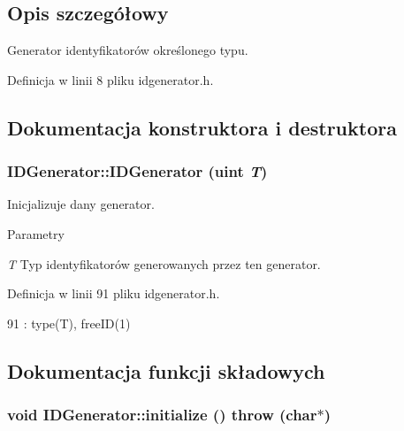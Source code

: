 \subsection{Opis szczegółowy}
Generator identyfikatorów określonego typu. 

Definicja w linii 8 pliku idgenerator.h.



\subsection{Dokumentacja konstruktora i destruktora}
\hypertarget{classIDGenerator_a9211b96bb2de7ec0479483c04b0263a5}{
\subsubsection[{IDGenerator}]{\setlength{\rightskip}{0pt plus 5cm}IDGenerator::IDGenerator (uint {\em T})}}
\label{classIDGenerator_a9211b96bb2de7ec0479483c04b0263a5}


Inicjalizuje dany generator. 


\begin{DoxyParams}{Parametry}
\item[{\em T}]Typ identyfikatorów generowanych przez ten generator. \end{DoxyParams}


Definicja w linii 91 pliku idgenerator.h.




\begin{DoxyCode}
91 : type(T), freeID(1) {}
\end{DoxyCode}




\subsection{Dokumentacja funkcji składowych}
\hypertarget{classIDGenerator_a16c5cba9a30dc95d05b72a1253fb54b2}{
\subsubsection[{initialize}]{\setlength{\rightskip}{0pt plus 5cm}void IDGenerator::initialize ()  throw (char$\ast$)}}
\label{classIDGenerator_a16c5cba9a30dc95d05b72a1253fb54b2}


